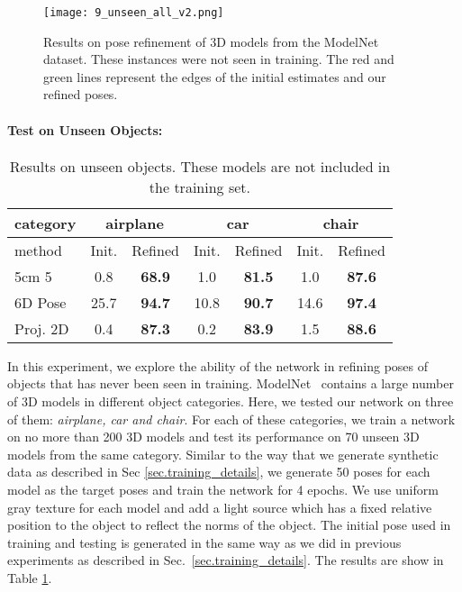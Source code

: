 \documentclass[twocolumn]{svjour3}
\begin{document}
\begin{figure*}[t]
	\centering
	\texttt{[image: 9\_unseen\_all\_v2.png]}
\caption{Results on pose refinement of 3D models from the ModelNet dataset. These instances were not seen in training. The red and green lines represent the edges of the initial estimates and our refined poses.}
\label{fig.unseen_demo}
\end{figure*}
\paragraph{Test on Unseen Objects:}

\begin{table}
\centering
\caption{Results on unseen objects. These models are not included in the training set.}
\small
\begin{tabular}{l|c|c|c|c|c|c}
\hline
category & \multicolumn{2}{c|}{airplane}& \multicolumn{2}{c|}{car}& \multicolumn{2}{c}{chair}\\
\hline
method  & Init. & Refined & Init. & Refined &Init. & Refined\\
\hline
5cm 5\degree	& 0.8 & \textbf{68.9} & 1.0 	& \textbf{81.5} & 1.0 	& \textbf{87.6} \\
6D Pose  & 25.7  & \textbf{94.7} & 10.8	& \textbf{90.7} & 14.6 & \textbf{97.4} \\
Proj. 2D & 0.4 & \textbf{87.3} & 0.2 	& \textbf{83.9} & 1.5	& \textbf{88.6} \\
\hline
\end{tabular}
\label{table.unseen_objects}
\end{table}

In this experiment, we explore the ability of the network in refining poses of objects that has never been seen in training. 
ModelNet~\citep{wu20153d} contains a large number of 3D models in different object categories. 
Here, we tested our network on three of them: \textit{airplane, car and chair}. For each of these categories, we train a network on no more than 200 3D models and test its performance on 70 unseen 3D models from the same category. Similar to the way that we generate synthetic data as described in Sec \ref{sec.training_details}, we generate 50 poses for each model as the target poses and train the network for 4 epochs. We use uniform gray texture for each model and add a light source which has a fixed relative position to the object to reflect the norms of the object. 
The initial pose used in training and testing is generated in the same way as we did in previous experiments as described in Sec.~\ref{sec.training_details}. The results are show in Table \ref{table.unseen_objects}.
\end{document}
